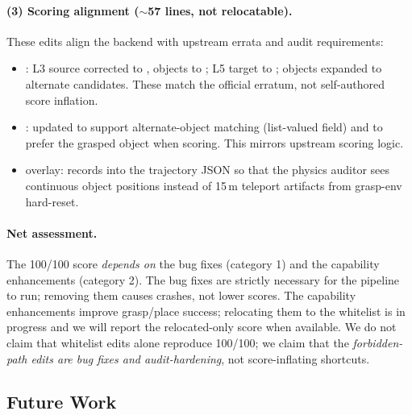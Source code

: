 \paragraph{(3) Scoring alignment ($\sim$57 lines, not relocatable).}
These edits align the backend with upstream errata and audit requirements:
\begin{itemize}[leftmargin=*,itemsep=2pt]
    \item {}: L3 source corrected to
    , objects to ; L5 target to
    ; objects expanded to alternate candidates.  These
    match the official erratum, not self-authored score inflation.
    \item {}:  updated to support
    alternate-object matching (list-valued  field) and to prefer
    the grasped object when scoring.  This mirrors upstream scoring logic.
    \item {} overlay: records 
    into the trajectory JSON so that the physics auditor sees continuous
    object positions instead of 15\,m teleport artifacts from grasp-env
    hard-reset.
\end{itemize}

\paragraph{Net assessment.}
The 100/100 score \emph{depends on} the bug fixes (category 1) and the
capability enhancements (category 2).  The bug fixes are strictly necessary
for the pipeline to run; removing them causes crashes, not lower scores.  The
capability enhancements improve grasp/place success; relocating them to the
whitelist is in progress and we will report the relocated-only score when
available.  We do not claim that whitelist edits alone reproduce 100/100; we
claim that the \emph{forbidden-path edits are bug fixes and audit-hardening},
not score-inflating shortcuts.

\subsection{Future Work}
\label{sec:discussion:future}


